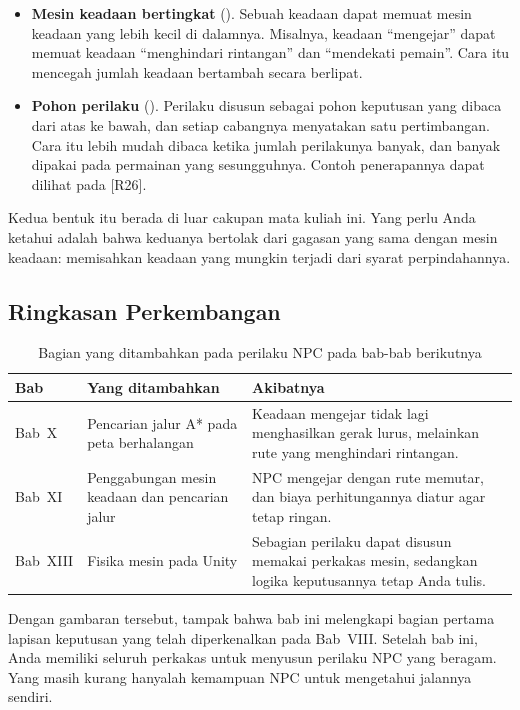 \begin{itemize}
  \item \textbf{Mesin keadaan bertingkat} (). Sebuah keadaan dapat memuat mesin keadaan yang lebih kecil di
        dalamnya. Misalnya, keadaan ``mengejar'' dapat memuat keadaan
        ``menghindari rintangan'' dan ``mendekati pemain''. Cara itu mencegah
        jumlah keadaan bertambah secara berlipat.
  \item \textbf{Pohon perilaku} (). Perilaku disusun
        sebagai pohon keputusan yang dibaca dari atas ke bawah, dan setiap
        cabangnya menyatakan satu pertimbangan. Cara itu lebih mudah dibaca
        ketika jumlah perilakunya banyak, dan banyak dipakai pada permainan
        yang sesungguhnya. Contoh penerapannya dapat dilihat pada \mbox{[R26]}.
\end{itemize}

Kedua bentuk itu berada di luar cakupan mata kuliah ini. Yang perlu Anda ketahui
adalah bahwa keduanya bertolak dari gagasan yang sama dengan mesin keadaan:
memisahkan keadaan yang mungkin terjadi dari syarat perpindahannya.

\subsection{Ringkasan Perkembangan}

\begin{table}[htbp]
\centering
\caption{Bagian yang ditambahkan pada perilaku NPC pada bab-bab berikutnya}
\label{tab:perkembangan-npc}
{\setlength{\tabcolsep}{4pt}\footnotesize%
\begin{tabularx}{\textwidth}{@{}C{1.6cm} L{5.0cm} Y@{}}
\toprule
\headrow \textbf{Bab} & \textbf{Yang ditambahkan} & \textbf{Akibatnya} \\
\midrule
Bab~X & Pencarian jalur A* pada peta berhalangan &
Keadaan mengejar tidak lagi menghasilkan gerak lurus, melainkan rute yang
menghindari rintangan. \\
\addlinespace
Bab~XI & Penggabungan mesin keadaan dan pencarian jalur &
NPC mengejar dengan rute memutar, dan biaya perhitungannya diatur agar tetap
ringan. \\
\addlinespace
Bab~XIII & Fisika mesin pada Unity &
Sebagian perilaku dapat disusun memakai perkakas mesin, sedangkan logika
keputusannya tetap Anda tulis. \\
\bottomrule
\end{tabularx}}
\end{table}

Dengan gambaran tersebut, tampak bahwa bab ini melengkapi bagian pertama
lapisan keputusan yang telah diperkenalkan pada Bab~VIII. Setelah bab ini, Anda
memiliki seluruh perkakas untuk menyusun perilaku NPC yang beragam. Yang masih
kurang hanyalah kemampuan NPC untuk mengetahui jalannya sendiri.
